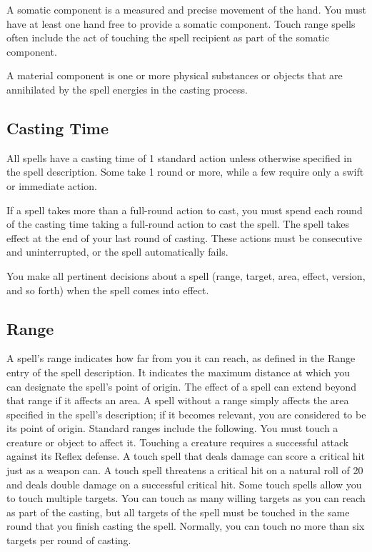  A somatic component is a measured and precise movement of the hand. You must have at least one hand free to provide a somatic component. Touch range spells often include the act of touching the spell recipient as part of the somatic component.

 A material component is one or more physical substances or objects that are annihilated by the spell energies in the casting process.

\subsection{Casting Time}
All spells have a casting time of 1 standard action unless otherwise specified in the spell description. Some take 1 round or more, while a few require only a swift or immediate action.

If a spell takes more than a full-round action to cast, you must spend each round of the casting time taking a full-round action to cast the spell. The spell takes effect at the end of your last round of casting. These actions must be consecutive and uninterrupted, or the spell automatically fails.

You make all pertinent decisions about a spell (range, target, area, effect, version, and so forth) when the spell comes into effect.

\subsection{Range}
A spell's range indicates how far from you it can reach, as defined in the Range entry of the spell description. It indicates the maximum distance at which you can designate the spell's point of origin. The effect of a spell can extend beyond that range if it affects an area. A spell without a range simply affects the area specified in the spell's description; if it becomes relevant, you are considered to be its point of origin. Standard ranges include the following.
 You must touch a creature or object to affect it. Touching a creature requires a successful attack against its Reflex defense. A touch spell that deals damage can score a critical hit just as a weapon can. A touch spell threatens a critical hit on a natural roll of 20 and deals double damage on a successful critical hit. Some touch spells allow you to touch multiple targets. You can touch as many willing targets as you can reach as part of the casting, but all targets of the spell must be touched in the same round that you finish casting the spell. Normally, you can touch no more than six targets per round of casting.


